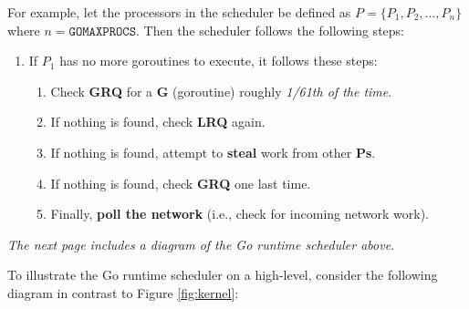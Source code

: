 \begin{Def}
\noindent
For example, let the processors in the scheduler be defined as 
$
P = \{ P_1, P_2, \dots, P_n \}
$
where \( n = \texttt{GOMAXPROCS} \). Then the scheduler follows the following steps:
\begin{enumerate}
    \item If \( P_1 \) has no more goroutines to execute, it follows these steps:
    \begin{enumerate}
        \item Check \textbf{GRQ} for a \textbf{G} (goroutine) roughly \textit{1/61th of the time}.
        \item If nothing is found, check \textbf{LRQ} again.
        \item If nothing is found, attempt to \textbf{steal} work from other \textbf{Ps}.
        \item If nothing is found, check \textbf{GRQ} one last time.
        \item Finally, \textbf{poll the network} (i.e., check for incoming network work).
    \end{enumerate}
\end{enumerate}
\end{Def}

\vfill
\begin{center}
    
    \textit{The next page includes a diagram of the Go runtime scheduler above.}
\end{center}

\vfill
\newpage
\noindent
To illustrate the Go runtime scheduler on a high-level, consider the following diagram in contrast to Figure \ref{fig:kernel}: 


